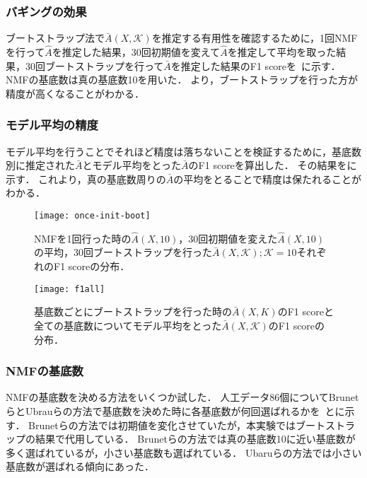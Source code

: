 \subsubsection{バギングの効果}
ブートストラップ法で$\bar{A}(X,\mathcal{K})$を推定する有用性を確認するために，1回NMFを行って$\hat{A}$を推定した結果，30回初期値を変えて$\hat{A}$を推定して平均を取った結果，30回ブートストラップを行って$\bar{A}$を推定した結果のF1 scoreを~に示す．
NMFの基底数は真の基底数10を用いた．
より，ブートストラップを行った方が精度が高くなることがわかる．

\subsubsection{モデル平均の精度}
モデル平均を行うことでそれほど精度は落ちないことを検証するために，基底数別に推定された$\bar{A}$とモデル平均をとった$\bar{A}$のF1 scoreを算出した．
その結果をに示す．
これより，真の基底数周りの$\bar{A}$の平均をとることで精度は保たれることがわかる．

\begin{figure}[htbp]
    \begin{minipage}{0.5\hsize}
			\begin{center}
					\texttt{[image: once-init-boot]}
					\caption{NMFを1回行った時の$\hat{A}(X,10)$，30回初期値を変えた$\hat{A}(X,10)$の平均，30回ブートストラップを行った$\bar{A}(X,\mathcal{K}); \mathcal{K} = {10}$それぞれのF1 scoreの分布．}
					\label{fig:once-init-boot}
			\end{center}
		\end{minipage}
    \begin{minipage}{0.5\hsize}
			\begin{center}
					\texttt{[image: f1all]}
					\caption{基底数ごとにブートストラップを行った時の$\bar{A}(X,{K})$のF1 scoreと全ての基底数についてモデル平均をとった$\bar{A}(X,\mathcal{K})$のF1 scoreの分布．}
					\label{fig:f1all}
			\end{center}
		\end{minipage}
\end{figure}

\subsubsection{NMFの基底数}
NMFの基底数を決める方法をいくつか試した．
人工データ86個についてBrunetらとUbrauらの方法で基底数を決めた時に各基底数が何回選ばれるかを~とに示す．
Brunetらの方法では初期値を変化させていたが，本実験ではブートストラップの結果で代用している．
Brunetらの方法では真の基底数10に近い基底数が多く選ばれているが，小さい基底数も選ばれている．
Ubaruらの方法では小さい基底数が選ばれる傾向にあった．

